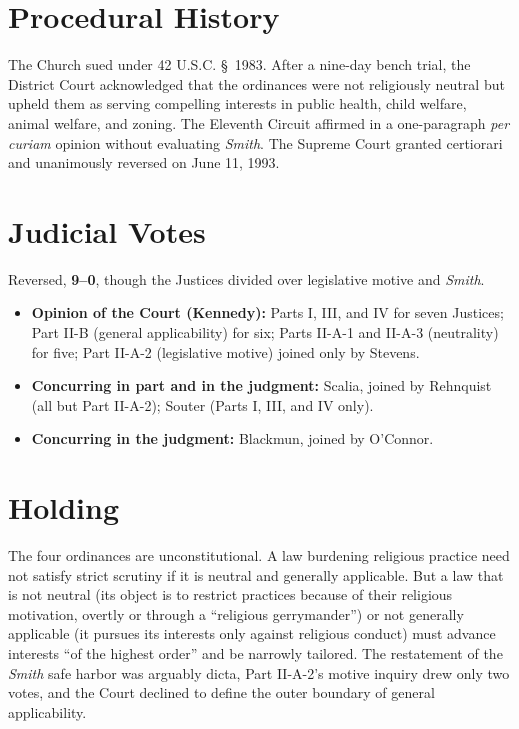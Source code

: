 \documentclass[12pt]{article}
\begin{document}
\section{Procedural History}

The Church sued under 42 U.S.C. \S~1983. After a nine-day bench trial, the District Court acknowledged that the ordinances were not religiously neutral but upheld them as serving compelling interests in public health, child welfare, animal welfare, and zoning. The Eleventh Circuit affirmed in a one-paragraph \textit{per curiam} opinion without evaluating \textit{Smith}. The Supreme Court granted certiorari and unanimously reversed on June 11, 1993.

\section{Judicial Votes}

Reversed, \textbf{9--0}, though the Justices divided over legislative motive and \textit{Smith}.
\begin{itemize}
\item \textbf{Opinion of the Court (Kennedy):} Parts I, III, and IV for seven Justices; Part II-B (general applicability) for six; Parts II-A-1 and II-A-3 (neutrality) for five; Part II-A-2 (legislative motive) joined only by Stevens.
\item \textbf{Concurring in part and in the judgment:} Scalia, joined by Rehnquist (all but Part II-A-2); Souter (Parts I, III, and IV only).
\item \textbf{Concurring in the judgment:} Blackmun, joined by O'Connor.
\end{itemize}

\section{Holding}

The four ordinances are unconstitutional. A law burdening religious practice need not satisfy strict scrutiny if it is neutral and generally applicable. But a law that is not neutral (its object is to restrict practices because of their religious motivation, overtly or through a ``religious gerrymander'') or not generally applicable (it pursues its interests only against religious conduct) must advance interests ``of the highest order'' and be narrowly tailored. The restatement of the \textit{Smith} safe harbor was arguably dicta, Part II-A-2's motive inquiry drew only two votes, and the Court declined to define the outer boundary of general applicability.
\end{document}
